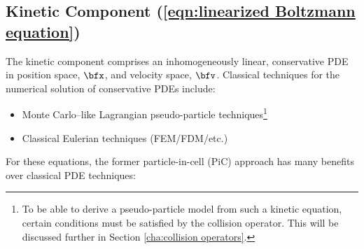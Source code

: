 \subsection*{Kinetic Component (\ref{eqn:linearized Boltzmann equation})}
    The kinetic component comprises an inhomogeneously linear, conservative PDE in position space, $\bfx$, and velocity space, $\bfv$. Classical techniques for the numerical solution of conservative PDEs include:
    \begin{itemize}
        \item  Monte Carlo--like Lagrangian pseudo-particle techniques\footnote{To be able to derive a pseudo-particle model from such a kinetic equation, certain conditions must be satisfied by the collision operator. This will be discussed further in Section \ref{cha:collision operators}.}
        \item  Classical Eulerian techniques (FEM/FDM/etc.)
    \end{itemize}
    For these equations, the former particle-in-cell (PiC) approach has many benefits over classical PDE techniques: 
